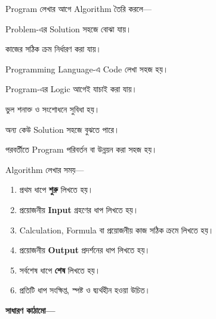 Program লেখার আগে Algorithm তৈরি করলে—

\begin{compacttwocolpoints}

\item Problem-এর Solution সহজে বোঝা যায়।

\item কাজের সঠিক ক্রম নির্ধারণ করা যায়।

\item Programming Language-এ Code লেখা সহজ হয়।

\item Program-এর Logic আগেই যাচাই করা যায়।

\item ভুল শনাক্ত ও সংশোধনে সুবিধা হয়।

\item অন্য কেউ Solution সহজে বুঝতে পারে।

\item পরবর্তীতে Program পরিবর্তন বা উন্নয়ন করা সহজ হয়।

\end{compacttwocolpoints}


Algorithm লেখার সময়—

\begin{enumerate}

\item প্রথম ধাপে \textbf{শুরু} লিখতে হয়।

\item প্রয়োজনীয় \textbf{Input} গ্রহণের ধাপ লিখতে হয়।

\item Calculation, Formula বা প্রয়োজনীয় কাজ সঠিক ক্রমে লিখতে হয়।

\item প্রয়োজনীয় \textbf{Output} প্রদর্শনের ধাপ লিখতে হয়।

\item সর্বশেষ ধাপে \textbf{শেষ} লিখতে হয়।

\item প্রতিটি ধাপ সংক্ষিপ্ত, স্পষ্ট ও দ্ব্যর্থহীন হওয়া উচিত।

\end{enumerate}

\textbf{সাধারণ কাঠামো—}

